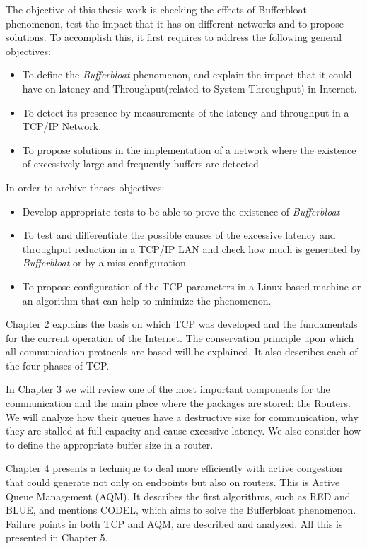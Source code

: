 The objective of this thesis work is checking the effects of
Bufferbloat phenomenon, test the impact that it has on different networks
and to propose solutions. To accomplish this, it first requires to
address the following general objectives:

\begin{itemize}
	\item To define the \textit{Bufferbloat} phenomenon, and explain the impact that it could have on latency and \gls{Throughput}(related to \gls{System Throughput}) in Internet.
	\item To detect its presence by measurements of the latency and throughput in a TCP/IP Network.
	\item To propose solutions in the implementation of a network where the existence of excessively large and frequently buffers are detected
\end{itemize}

In order to archive theses objectives:

\begin{itemize}
\item Develop appropriate tests to be able to prove the existence of \textit{Bufferbloat}
\item To test and differentiate the possible causes of the excessive latency and throughput reduction in a TCP/IP LAN and check how much is generated by \textit{Bufferbloat} or by a miss-configuration
\item To propose configuration of the TCP parameters in a Linux based machine or an algorithm that can help to minimize the phenomenon.
\end{itemize}

Chapter 2 explains the basis on which TCP was developed and
the fundamentals for the current operation of the Internet. The conservation
principle upon which all communication protocols are based will be explained.
It also describes each of the four phases of TCP.

In Chapter 3 we will review one of the most important components for the
communication and the main place where the packages are stored: the Routers.
We will analyze how their queues have a destructive size for
communication, why they are stalled at full capacity and cause excessive
latency. We also consider how to define the appropriate buffer size in a router.

Chapter 4 presents a technique to deal more efficiently with
active congestion that could generate not only on endpoints but also on
routers. This is Active Queue Management (AQM). It describes the first
algorithms, such as RED and BLUE, and mentions
CODEL, which aims to solve the Bufferbloat phenomenon. Failure points
in both TCP and AQM, are described and analyzed. All this is presented in
Chapter 5.


